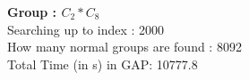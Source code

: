 \textbf{Group : $C_2*C_8$}\\
Searching up to index : 2000\\
How many normal groups are found : 8092\\
Total Time (in s) in GAP: 10777.8\\
